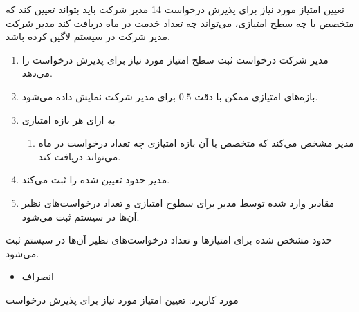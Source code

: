 
{
	\usecase
	{تعیین امتیاز مورد نیاز برای پذیرش درخواست}
	{14}
	{مدیر شرکت باید بتواند تعیین کند که متخصص با چه سطح امتیازی، می‌تواند چه تعداد خدمت در ماه دریافت کند}
	{مدیر شرکت}
	{}
	{مدیر شرکت در سیستم لاگین کرده باشد.}
	{
		\vspace*{-0.6cm}
		\begin{enumerate}
			\item مدیر شرکت درخواست ثبت سطح امتیاز مورد نیاز برای پذیرش درخواست را می‌دهد.
			\item بازه‌های امتیازی ممکن با دقت $0.5$ برای مدیر شرکت نمایش داده می‌شود.
			
			\item به ازای هر بازه امتیازی
			\begin{enumerate}[label=\theenumi.\arabic*.]
				\item مدیر مشخص می‌کند که متخصص با آن بازه امتیازی چه تعداد درخواست در ماه می‌تواند دریافت کند.
			\end{enumerate}
			\item 
			مدیر حدود تعیین شده را ثبت می‌کند.
			\item 
			مقادیر وارد شده توسط مدیر برای سطوح امتیازی و تعداد درخواست‌های نظیر آن‌ها در سیستم ثبت می‌شود.
		\end{enumerate}
	}
	{حدود مشخص شده برای امتیازها و تعداد‌ درخواست‌های نظیر آن‌ها در سیستم ثبت می‌شود.}
	{
		\begin{itemize}
			\item
			انصراف
		\end{itemize}
	}
	{
		مورد کاربرد: تعیین امتیاز مورد نیاز برای پذیرش درخواست
	}
}

	
	


